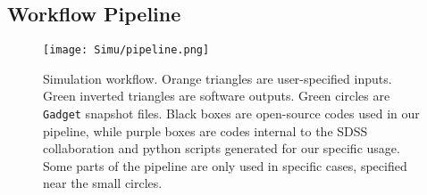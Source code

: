 \vspace*{1.5pc}


\subsection{Workflow Pipeline}
\label{sec:pipeline}

\begin{figure}
\centering
\texttt{[image: Simu/pipeline.png]}
\caption{Simulation workflow. Orange triangles are user-specified inputs. Green inverted triangles are software outputs. Green circles are \texttt{Gadget} snapshot files. Black boxes are open-source codes used in our pipeline, while purple boxes are codes internal to the SDSS collaboration and python scripts generated for our specific usage. Some parts of the pipeline are only used in specific cases, specified near the small circles.}\label{fig:pipeline}
\end{figure}


